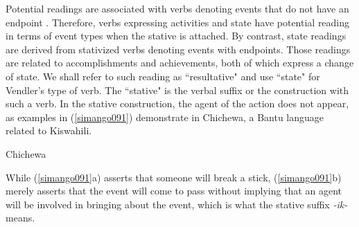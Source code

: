 \documentclass[output=paper]{langscibook}
\begin{document}
\begin{table} 
    \caption{Aspectual types of verbs (based on \citealt{vendler67})\label{con_ngo:table2}}
\end{table}

Potential readings are associated with verbs denoting events that do not have an endpoint \citep{Dubinsky:1996}. Therefore, verbs expressing activities and state have potential reading in terms of event types when the stative is attached. By contrast, state readings are derived from stativized verbs denoting events with endpoints. Those readings are related to accomplishments and achievements, both of which express a change of state.  We shall refer to such reading as “resultative" and use “state" for Vendler's type of verb. The “stative" is the verbal suffix or the construction with such a verb. In the stative construction, the agent of the action does not appear, as examples in (\ref{simango091}) demonstrate in Chichewa, a Bantu language related to Kiswahili. 

\begin{exe}
\ex Chichewa \citep[122]{Simango:2009aa} \label{simango091}

\begin{xlist}
\end{xlist}

\end{exe}
While (\ref{simango091}a) asserts that someone will break a stick, (\ref{simango091}b) merely asserts that the event will come to pass without implying that an agent will be involved in bringing about the event, which is what the stative suffix \textit{-ik-} means. 
\end{document}
